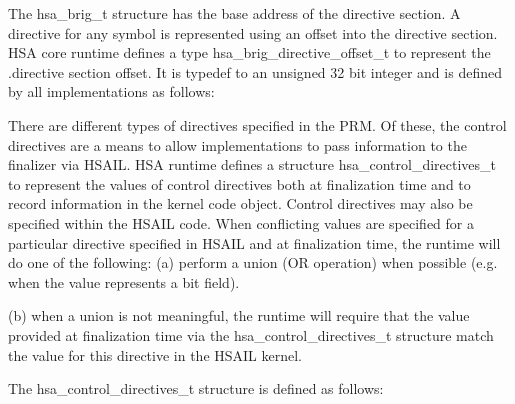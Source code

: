 \documentclass{book}
\newcommand{\reftyp}[1]{#1}
\begin{document}
\begin{appendices}
The \reftyp{hsa\_brig\_t} structure has the base address of the
directive section. A directive for any symbol is represented using
an offset into the directive section. HSA core runtime defines a
type \reftyp{hsa\_brig\_directive\_offset\_t} to represent the
.directive section offset. It is typedef to an unsigned 32 bit
integer and is defined by all implementations as follows:

\makeatletter{} 

There are different types of directives specified in the PRM. Of
these, the control directives are a means to allow implementations
to pass information to the finalizer via HSAIL. HSA runtime
defines a structure \reftyp{hsa\_control\_directives\_t} to
represent the values of control directives both at finalization
time and to record information in the kernel code object. Control
directives may also be specified within the HSAIL code. When
conflicting values are specified for a particular directive
specified in HSAIL and at finalization time, the runtime will do one
of the following: (a) perform a union (OR operation) when possible
(e.g. when the value represents a bit field).

(b) when a union is not meaningful, the runtime will require that the
value provided at finalization time via the
\reftyp{hsa\_control\_directives\_t} structure match the value for
this directive in the HSAIL kernel.

The \reftyp{hsa\_control\_directives\_t} structure is defined as
follows:

\makeatletter{}


\end{appendices}
\end{document}
